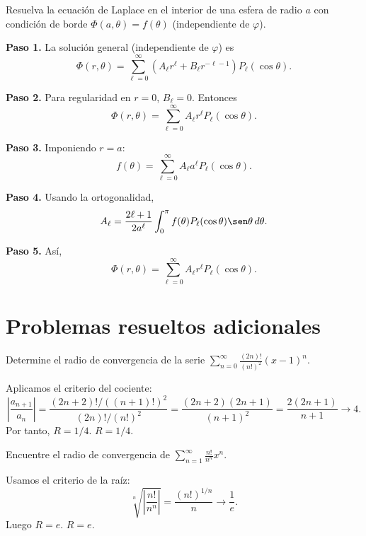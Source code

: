 \begin{example}
  Resuelva la ecuación de Laplace en el interior de una esfera de radio $a$ con condición de borde $\Phi(a,\theta)=f(\theta)$ (independiente de $\varphi$).
  \begin{myproof}
    \textbf{Paso 1.} La solución general (independiente de $\varphi$) es
    \[
      \Phi(r,\theta)=\sum_{\ell=0}^{\infty} \left(A_\ell r^\ell + B_\ell r^{-\ell-1}\right) P_\ell(\cos\theta).
    \]
    
    \textbf{Paso 2.} Para regularidad en $r=0$, $B_\ell=0$. Entonces
    \[
      \Phi(r,\theta)=\sum_{\ell=0}^{\infty} A_\ell r^\ell P_\ell(\cos\theta).
    \]
    
    \textbf{Paso 3.} Imponiendo $r=a$:
    \[
      f(\theta)=\sum_{\ell=0}^{\infty} A_\ell a^\ell P_\ell(\cos\theta).
    \]
    
    \textbf{Paso 4.} Usando la ortogonalidad,
    \[
      A_\ell = \frac{2\ell+1}{2a^\ell}\int_{0}^{\pi} f(\theta)P_\ell(\cos\theta)\sen\theta\,d\theta.
    \]
    
    \textbf{Paso 5.} Así,
    \[
      \boxed{
        \Phi(r,\theta)=\sum_{\ell=0}^{\infty} A_\ell r^\ell P_\ell(\cos\theta)
      }.
    \]
  \end{myproof}
\end{example}

\section{Problemas resueltos adicionales}

\begin{prob}
  Determine el radio de convergencia de la serie $\displaystyle\sum_{n=0}^{\infty} \frac{(2n)!}{(n!)^2} (x-1)^n$.
  \begin{myproof}
    Aplicamos el criterio del cociente:
    \[
      \left|\frac{a_{n+1}}{a_n}\right|
      = \frac{(2n+2)!/((n+1)!)^2}{(2n)!/(n!)^2}
      = \frac{(2n+2)(2n+1)}{(n+1)^2}
      = \frac{2(2n+1)}{n+1} \to 4.
    \]
    Por tanto, $R=1/4$. $\boxed{R=1/4}$.
  \end{myproof}
\end{prob}

\begin{prob}
  Encuentre el radio de convergencia de $\displaystyle\sum_{n=1}^{\infty} \frac{n!}{n^n} x^n$.
  \begin{myproof}
    Usamos el criterio de la raíz:
    \[
      \sqrt[n]{\left|\frac{n!}{n^n}\right|}
      = \frac{(n!)^{1/n}}{n} \to \frac{1}{e}.
    \]
    Luego $R=e$. $\boxed{R=e}$.
  \end{myproof}
\end{prob}

